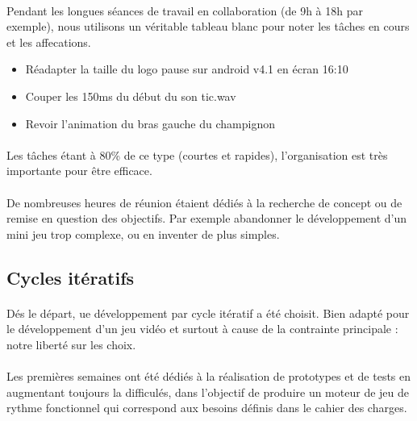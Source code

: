 \paragraph{}
Pendant les longues séances de travail en collaboration (de 9h à 18h par exemple), nous utilisons un véritable tableau blanc pour noter les tâches en cours et les affecations.

\begin{itemize}
\item Réadapter la taille du logo pause sur android v4.1 en écran 16:10
\item Couper les 150ms du début du son tic.wav
\item Revoir l’animation du bras gauche du champignon
\end{itemize}

\paragraph{}
Les tâches étant à 80\% de ce type (courtes et rapides), l’organisation est très importante pour être efficace.

\paragraph{}
De nombreuses heures de réunion étaient dédiés à la recherche de concept ou de remise en question des objectifs. Par exemple abandonner le développement d’un mini jeu trop complexe, ou en inventer de plus simples.

\subsection{Cycles itératifs}

\paragraph{}
Dés le départ, ue développement par cycle itératif a été choisit. Bien adapté pour le développement d’un jeu vidéo et surtout à cause de la contrainte principale : notre liberté sur les choix.

\paragraph{}
Les premières semaines ont été dédiés à la réalisation de prototypes et de tests en augmentant toujours la difficulés, dans l’objectif de produire un moteur de jeu de rythme fonctionnel qui correspond aux besoins définis dans le cahier des charges.

